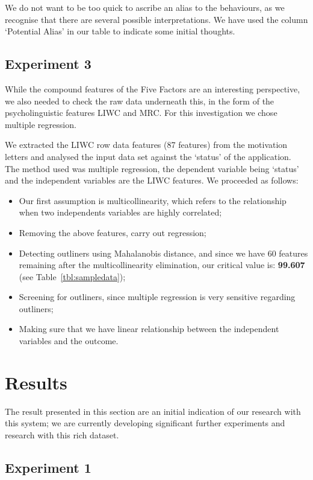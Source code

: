 \documentclass[letterpaper]{article}
\begin{document}
We do not want to be too quick to ascribe an alias to the behaviours,
as we recognise that there are several possible interpretations. We
have used the column `Potential Alias' in our table to indicate some
initial thoughts.


\subsection{Experiment 3}

While the compound features of the Five Factors are an interesting
perspective, we also needed to check the raw data underneath this, in
the form of the psycholinguistic features LIWC and MRC. For this
investigation we chose multiple regression.

We extracted the LIWC row data features (87 features) from the
motivation letters and analysed the input data set against the
`status' of the application. The method used was multiple regression,
the dependent variable being `status' and the independent variables
are the LIWC features. We proceeded as follows:

\begin{itemize}
\item Our first assumption is multicollinearity, which refers to the
  relationship when two independents variables are highly correlated;
\item Removing the above features, carry out regression;
\item Detecting outliners using Mahalanobis distance, and since we
  have 60 features remaining after the multicollinearity elimination,
  our critical value is: {\textbf{99.607}} (see Table~\ref{tbl:sampledata});
\item Screening for outliners, since multiple regression is very
  sensitive regarding outliners;
\item Making sure that we have linear relationship between the
  independent variables and the outcome.
\end{itemize}


\section{Results}

The result presented in this section are an initial indication of our
research with this system; we are currently developing
significant further experiments and research with this rich dataset.

\subsection{Experiment 1}
\end{document}
